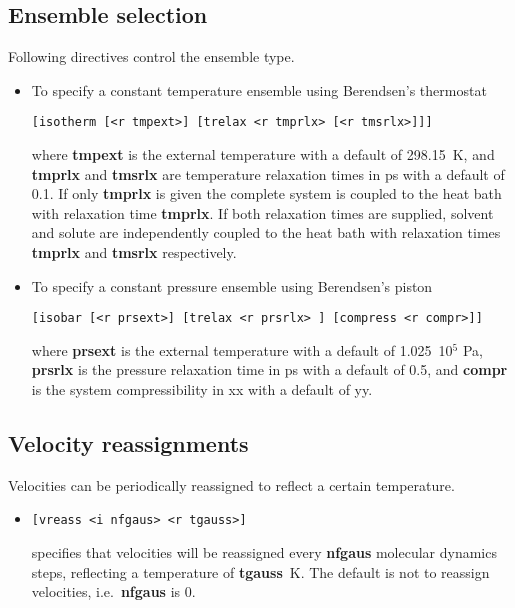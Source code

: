 \subsection{Ensemble selection}
Following directives control the ensemble type.
\begin{itemize}
\item
To specify a constant temperature ensemble using Berendsen's thermostat
\begin{verbatim}
[isotherm [<r tmpext>] [trelax <r tmprlx> [<r tmsrlx>]]]
\end{verbatim}
where {\bf tmpext} is the external temperature with a default of 298.15~K,
and {\bf tmprlx} and {\bf tmsrlx} are temperature relaxation times in ps 
with a default of 0.1. If only {\bf tmprlx} is given the complete system
is coupled to the heat bath with relaxation time {\bf tmprlx}. If both
relaxation times are supplied, solvent and solute are independently coupled
to the heat bath with relaxation times {\bf tmprlx} and {\bf tmsrlx}
respectively.
\item
To specify a constant pressure ensemble using Berendsen's piston
\begin{verbatim}
[isobar [<r prsext>] [trelax <r prsrlx> ] [compress <r compr>]]
\end{verbatim}
where {\bf prsext} is the external temperature with a default of 1.025~10$^5$ Pa,
{\bf prsrlx} is the pressure relaxation time in ps with a default of 0.5, and
{\bf compr} is the system compressibility in xx with a default of yy.
\end{itemize}
\subsection{Velocity reassignments}
Velocities can be periodically reassigned to reflect a certain temperature.
\begin{itemize}
\item
\begin{verbatim}
[vreass <i nfgaus> <r tgauss>]
\end{verbatim}
specifies that velocities will be reassigned every {\bf nfgaus} molecular
dynamics steps, reflecting a temperature of {\bf tgauss}~K. The default
is not to reassign velocities, i.e.\ {\bf nfgaus} is 0.
\end{itemize}
